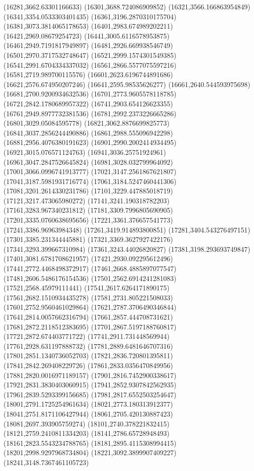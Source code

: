 {(16281,3662.63301166633)
(16301,3688.724086909852)
(16321,3566.166863954849)
(16341,3354.0533303401435)
(16361,3196.2870310175704)
(16381,3073.3814065178653)
(16401,2983.674989202211)
(16421,2969.08679254723)
(16441,3005.6116578953875)
(16461,2949.7191817949897)
(16481,2926.669938546749)
(16501,2970.3717532748647)
(16521,2999.1574301549385)
(16541,2991.6704334337032)
(16561,2866.5577075597216)
(16581,2719.989700115576)
(16601,2623.6196744891686)
(16621,2576.674950207246)
(16641,2595.98535626277)
(16661,2640.544593975698)
(16681,2700.9200934632536)
(16701,2773.9605578118785)
(16721,2842.1780689957322)
(16741,2903.654126623355)
(16761,2949.8977732381536)
(16781,2992.2373226665286)
(16801,3029.05084595778)
(16821,3062.8876699825773)
(16841,3037.2856244490886)
(16861,2988.555096942298)
(16881,2956.4076380191623)
(16901,2990.2002414934495)
(16921,3015.076571124763)
(16941,3036.25751924961)
(16961,3047.2847526645824)
(16981,3028.032799964092)
(17001,3066.0996741913777)
(17021,3147.2561867621807)
(17041,3187.5981931716774)
(17061,3184.5247460441306)
(17081,3201.2614330231786)
(17101,3229.447885018719)
(17121,3217.473065980272)
(17141,3241.190318782203)
(17161,3283.967340231812)
(17181,3309.7996805690905)
(17201,3335.0760638695656)
(17221,3361.376657541773)
(17241,3386.96963984348)
(17261,3419.914893800851)
(17281,3404.543276497151)
(17301,3385.231344445881)
(17321,3369.3627927422176)
(17341,3293.399667310984)
(17361,3243.44026820827)
(17381,3198.293693749847)
(17401,3081.6781708621957)
(17421,2930.092295612496)
(17441,2772.4468498372917)
(17461,2668.4885897077547)
(17481,2606.5486176154536)
(17501,2562.6914241281083)
(17521,2568.45979111441)
(17541,2617.6264171890175)
(17561,2682.1510934435278)
(17581,2731.805221508033)
(17601,2752.9560461029864)
(17621,2787.3706490346844)
(17641,2814.0057662316794)
(17661,2857.444708731621)
(17681,2872.2118512383695)
(17701,2867.5197188760817)
(17721,2872.674403771722)
(17741,2911.731448569944)
(17761,2928.631197888732)
(17781,2889.6481646707316)
(17801,2851.1340736052703)
(17821,2836.720801395811)
(17841,2842.269408229726)
(17861,2833.0356470849956)
(17881,2820.0016971189157)
(17901,2816.7452900338617)
(17921,2831.3830403060915)
(17941,2852.9307842562935)
(17961,2839.5293399156685)
(17981,2817.6552503254647)
(18001,2791.1725254961634)
(18021,2773.180313912377)
(18041,2751.8171106427944)
(18061,2705.420130887423)
(18081,2697.393905759274)
(18101,2740.378221832415)
(18121,2759.2410811334203)
(18141,2786.65728948493)
(18161,2823.5543234788765)
(18181,2895.4115308994415)
(18201,2998.9297968734804)
(18221,3092.3899907409227)
(18241,3148.7367461105723)
}
